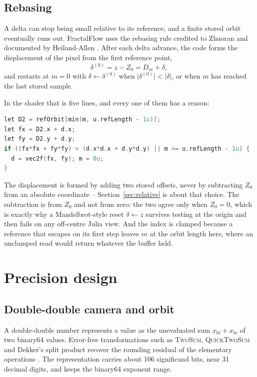 \documentclass[10pt,a4paper]{article}
\begin{document}
\subsection{Rebasing}

A delta can stop being small relative to its reference, and a finite stored
orbit eventually runs out. FractalFlow uses the rebasing rule credited to
Zhuoran and documented by Heiland-Allen \cite{heilandallen2022}. After each
delta advance, the code forms the displacement of the pixel from the first
reference point,
\begin{equation}
  \delta^{(0)} = z-Z_0 = D_m+\delta,
  \label{eq:rebase}
\end{equation}
and restarts at \(m=0\) with \(\delta\leftarrow\delta^{(0)}\) when
\(\lvert\delta^{(0)}\rvert<\lvert\delta\rvert\), or when \(m\) has reached the
last stored sample.

In the shader that is five lines, and every one of them has a reason:

\begin{lstlisting}[language=C]
let D2 = refOrbit[min(m, u.refLength - 1u)];
let fx = D2.x + d.x;
let fy = D2.y + d.y;
if ((fx*fx + fy*fy) < (d.x*d.x + d.y*d.y) || m >= u.refLength - 1u) {
  d = vec2f(fx, fy); m = 0u;
}
\end{lstlisting}

The displacement is formed by adding two stored offsets, never by subtracting
\(Z_0\) from an absolute coordinate -- Section~\ref{sec:relative} is about that
choice. The subtraction is from \(Z_0\) and not from zero: the two agree only
when \(Z_0=0\), which is exactly why a Mandelbrot-style reset
\(\delta\leftarrow z\) survives testing at the origin and then fails on any
off-centre Julia view. And the index is clamped because a reference that
escapes on its first step leaves \(m\) at the orbit length here, where an
unclamped read would return whatever the buffer held.

\section{Precision design}

\subsection{Double-double camera and orbit}

A double-double number represents a value as the unevaluated sum
\(x_{\mathrm{hi}}+x_{\mathrm{lo}}\) of two binary64 values. Error-free
transformations such as \textsc{TwoSum}, \textsc{QuickTwoSum} and Dekker's
split product recover the rounding residual of the elementary operations
\cite{dekker1971,knuth1998,hida2000}. The representation carries about 106
significand bits, near 31 decimal digits, and keeps the binary64 exponent
range.
\end{document}
